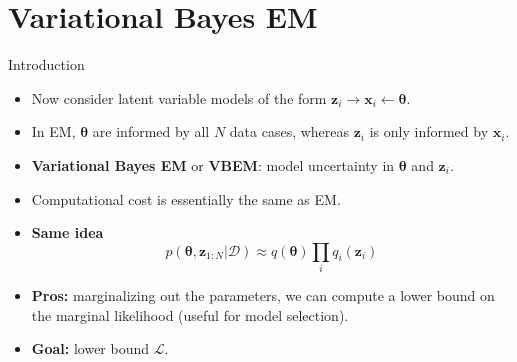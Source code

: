 \documentclass[10pt,mathserif]{beamer}
\begin{document}
\section{Variational Bayes EM}
\begin{frame}{Introduction}
\begin{itemize}
    \item Now consider latent variable models of the form $\bm{z}_i \rightarrow \bm{x}_i \leftarrow \bm{\theta}$.
    \item In EM, $\bm{\theta}$ are informed by all $N$ data cases, whereas $\bm{z}_i$ is only informed by $\bm{x}_i$.
    \item \textbf{Variational Bayes EM} or \textbf{VBEM}: model uncertainty in $\bm{\theta}$ and $\bm{z}_i$.
    \item Computational cost is essentially the same as EM.
    \item \textbf{Same idea}
    \begin{equation}
        p(\bm{\theta}, \bm{z}_{1:N}|\mathcal{D}) \approx q (\bm{\theta})\prod_i q_i(\bm{z}_i)
    \end{equation}
    \item \textbf{Pros:} marginalizing out the parameters, we can compute a lower bound on the marginal likelihood (useful for model selection).
    \item \textbf{Goal:} lower bound $\mathcal{L}$.
\end{itemize} 
\end{frame}
\end{document}
